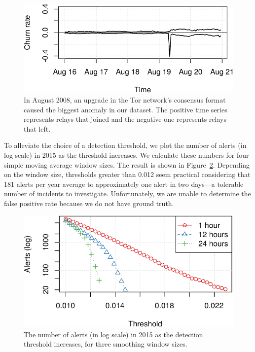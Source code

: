 \begin{figure}[t]
	\centering
	\includegraphics[width=\linewidth]{diagrams/2008-08.pdf}
	\caption{In August 2008, an upgrade in the Tor network's consensus format
	caused the biggest anomaly in our dataset.  The positive time series
	represents relays that joined and the negative one represents relays that
	left.}
	\label{fig:2008-08}
\end{figure}

To alleviate the choice of a detection threshold, we plot the number of alerts
(in log scale) in 2015 as the threshold increases.  We calculate these numbers
for four simple moving average window sizes.  The result is shown in
Figure~\ref{fig:threshold-alarm}.  Depending on the window size, thresholds
greater than 0.012 seem practical considering that 181 alerts per year average
to approximately one alert in two days---a tolerable number of incidents to
investigate.  Unfortunately, we are unable to determine the false positive rate
because we do not have ground truth.

\begin{figure}[t]
	\centering
	\includegraphics[width=0.9\linewidth]{diagrams/threshold-alarm.pdf}
	\caption{The number of alerts (in log scale) in 2015 as the detection
	threshold increases, for three smoothing window sizes.}
	\label{fig:threshold-alarm}
\end{figure}


